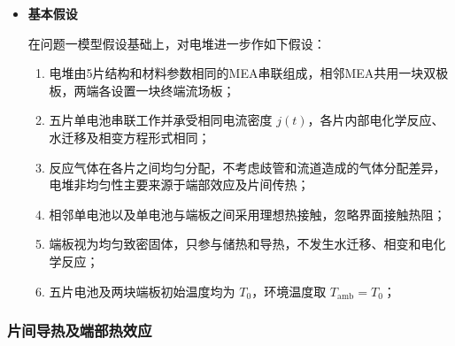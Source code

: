 \documentclass[bwprint]{gmcmthesis}
\numberwithin{equation}{section}
\numberwithin{figure}{section}
\begin{document}
\begin{itemize}
 为兼顾端板较大的热惯性和计算效率，本文采用7节点集中参数热网络，包括5个单电池节点 \(T_k(t)\) (\(k = 1,\dots,5\)) 和2个端板节点 \(T_{\text{EL}}(t)\)、\(T_{\text{ER}}(t)\)。其连接关系为
\begin{equation}
\text{EL} \overset{g_E}{\longleftrightarrow} 1 \overset{g_c}{\longleftrightarrow} 2 \overset{g_c}{\longleftrightarrow} 3 \overset{g_c}{\longleftrightarrow} 4 \overset{g_c}{\longleftrightarrow} 5 \overset{g_E}{\longleftrightarrow} \text{ER}. \label{eq:src:5-4}
\end{equation}

 其中，\(g_c\) 为相邻单电池间单位面积热导，\(g_E\) 为端部单电池与端板之间的单位面积耦合热导。端部单电池1和5同时按照题给条件与低温环境进行对流换热。

\item \textbf {基本假设}

 在问题一模型假设基础上，对电堆进一步作如下假设：

\begin{enumerate}
    \item 电堆由5片结构和材料参数相同的MEA串联组成，相邻MEA共用一块双极板，两端各设置一块终端流场板；
    \item 五片单电池串联工作并承受相同电流密度 \(j(t)\)，各片内部电化学反应、水迁移及相变方程形式相同；
    \item 反应气体在各片之间均匀分配，不考虑歧管和流道造成的气体分配差异，电堆非均匀性主要来源于端部效应及片间传热；
    \item 相邻单电池以及单电池与端板之间采用理想热接触，忽略界面接触热阻；
    \item 端板视为均匀致密固体，只参与储热和导热，不发生水迁移、相变和电化学反应；
    \item 五片电池及两块端板初始温度均为 \(T_0\)，环境温度取 \(T_{\text{amb}} = T_0\)；
\end{enumerate}

\end{itemize}

\subsubsection{片间导热及端部热效应}
\end{document}
